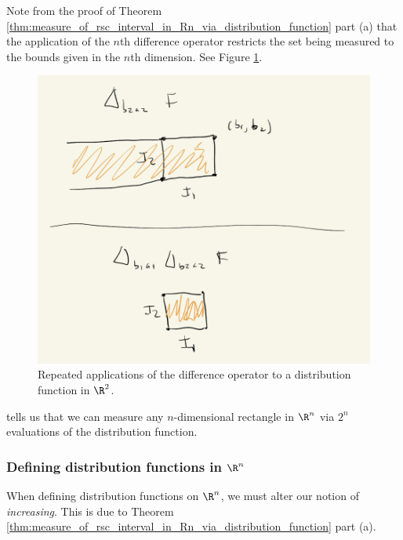 \documentclass{article} %
\begin{document}
\begin{remark}
Note from the proof of Theorem \ref{thm:measure_of_rsc_interval_in_Rn_via_distribution_function} part (a) that the application of the $n$th difference operator restricts the set being measured to the bounds given in the $n$th dimension.  See Figure \ref{fig:applying_the_difference_operator_to_distribution_functions_in_R2}.

\begin{figure}[H]
\centering
\includegraphics[width=.5\textwidth]{images/applying_the_difference_operator_to_distribution_functions_in_R2}	
\caption{Repeated applications of the difference operator to a distribution function in $\R^2$.}
\label{fig:applying_the_difference_operator_to_distribution_functions_in_R2}
\end{figure}


\end{remark}

\begin{remark}
 tells us that we can measure any $n$-dimensional rectangle in $\R^n$ via $2^n$ evaluations of the distribution function. 
\end{remark}


\subsubsection{Defining distribution functions in $\R^n$}

When defining distribution functions on $\R^n$,  we must alter our notion of \textit{increasing}.     This is due to Theorem \ref{thm:measure_of_rsc_interval_in_Rn_via_distribution_function} part (a).
\end{document}
